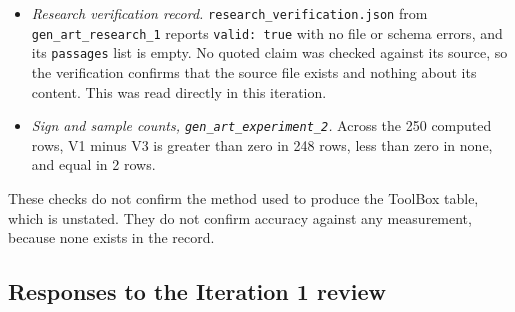 \documentclass[11pt,letterpaper]{article}
\begin{document}
\begin{itemize}
\item \emph{Research verification record.} \texttt{research\_\allowbreak verification.json} from \texttt{gen\_art\_research\_1} reports \texttt{valid: true} with no file or schema errors, and its \texttt{passages} list is empty. No quoted claim was checked against its source, so the verification confirms that the source file exists and nothing about its content. This was read directly in this iteration.
\item \emph{Sign and sample counts, \texttt{gen\_art\_experiment\_2}.} Across the 250 computed rows, V1 minus V3 is greater than zero in 248 rows, less than zero in none, and equal in 2 rows.
\end{itemize}

These checks do not confirm the method used to produce the ToolBox table, which is unstated. They do not confirm accuracy against any measurement, because none exists in the record.

\subsection{Responses to the Iteration 1 review}
\end{document}
